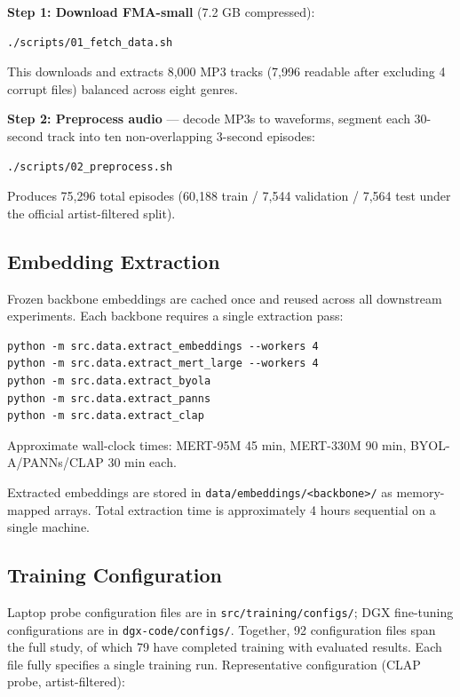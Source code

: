 \documentclass[conference]{IEEEtran}
\begin{document}
\textbf{Step 1: Download FMA-small} (7.2 GB compressed):

\begin{verbatim}
./scripts/01_fetch_data.sh
\end{verbatim}

This downloads and extracts 8,000 MP3 tracks (7,996 readable after
excluding 4 corrupt files) balanced across eight genres.

\textbf{Step 2: Preprocess audio} --- decode MP3s to waveforms,
segment each 30-second track into ten non-overlapping 3-second episodes:

\begin{verbatim}
./scripts/02_preprocess.sh
\end{verbatim}

Produces 75,296 total episodes (60,188 train / 7,544 validation / 7,564
test under the official artist-filtered split).

\subsection{Embedding Extraction}\label{c.-embedding-extraction}

Frozen backbone embeddings are cached once and reused across all
downstream experiments. Each backbone requires a single extraction pass:

\begin{verbatim}
python -m src.data.extract_embeddings --workers 4
python -m src.data.extract_mert_large --workers 4
python -m src.data.extract_byola
python -m src.data.extract_panns
python -m src.data.extract_clap
\end{verbatim}

Approximate wall-clock times: MERT-95M 45 min, MERT-330M 90 min,
BYOL-A/PANNs/CLAP 30 min each.

Extracted embeddings are stored in
\texttt{data/embeddings/\textless{}backbone\textgreater{}/} as
memory-mapped arrays. Total extraction time is approximately 4 hours
sequential on a single machine.

\subsection{Training Configuration}\label{d.-training-configuration}

Laptop probe configuration files are in \texttt{src/training/configs/};
DGX fine-tuning configurations are in \texttt{dgx-code/configs/}.
Together, 92 configuration files span the full study, of which 79 have
completed training with evaluated results. Each file fully specifies a
single training run. Representative configuration (CLAP probe,
artist-filtered):
\end{document}
